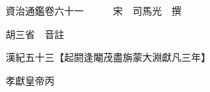 










 


 
 


 

  
  
  
  
  





  
  
  
  
  
 
  

  

  
  
  



  

 
 

  
   




  

  
  


  　　資治通鑑卷六十一　　　宋　司馬光　撰

　　胡三省　音註

　　漢紀五十三【起閼逢閹茂盡旃蒙大淵獻凡三年】

　　孝獻皇帝丙

